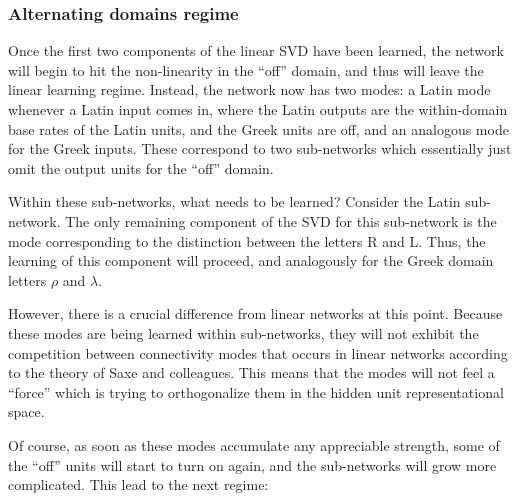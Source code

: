 \documentclass[11pt]{article}
\begin{document}
\subsubsection{Alternating domains regime}
Once the first two components of the linear SVD have been learned, the network will begin to hit the non-linearity in the ``off'' domain, and thus will leave the linear learning regime. Instead, the network now has two modes: a Latin mode whenever a Latin input comes in, where the Latin outputs are the within-domain base rates of the Latin units, and the Greek units are off, and an analogous mode for the Greek inputs. These correspond to two sub-networks which essentially just omit the output units for the ``off'' domain. \par
Within these sub-networks, what needs to be learned? Consider the Latin sub-network. The only remaining component of the SVD for this sub-network is the mode corresponding to the distinction between the letters R and L. Thus, the learning of this component will proceed, and analogously for the Greek domain letters \(\rho\) and \(\lambda\). \par
However, there is a crucial difference from linear networks at this point. Because these modes are being learned within sub-networks, they will not exhibit the competition between connectivity modes that occurs in linear networks according to the theory of Saxe and colleagues. This means that the modes will not feel a ``force'' which is trying to orthogonalize them in the hidden unit representational space. \par
Of course, as soon as these modes accumulate any appreciable strength, some of the ``off'' units will start to turn on again, and the sub-networks will grow more complicated. This lead to the next regime: \par
\end{document}
